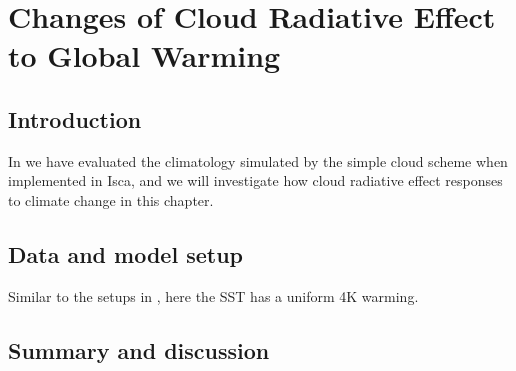 \chapter{Changes of Cloud Radiative Effect to Global Warming}

\section{Introduction}
In  we have evaluated the climatology simulated by the simple cloud scheme when implemented in Isca, and we will investigate how cloud radiative effect responses to climate change in this chapter. 

\section{Data and model setup}
Similar to the setups in , here the SST has a uniform 4K warming.


\section{Summary and discussion}
